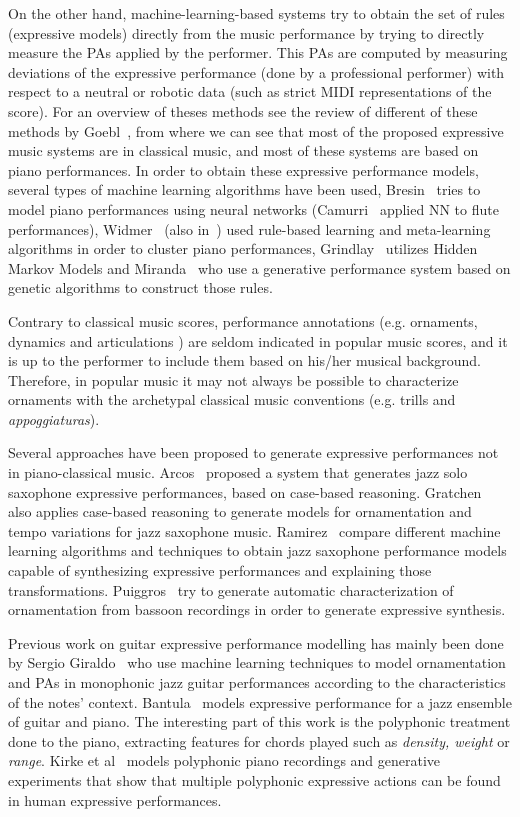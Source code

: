 On the other hand, machine-learning-based systems try to obtain the set of rules (expressive models) directly from the music performance by trying to directly measure the PAs applied by the performer. This PAs are computed by measuring deviations of the expressive performance (done by a professional performer) with respect to a neutral or robotic data (such as strict MIDI representations of the score). For an overview of theses methods see the review of different of these methods by Goebl~\cite{Goebl2005}, from where we can see that most of the proposed expressive music systems are in classical music, and most of these systems are based on piano performances. In order to obtain these expressive performance models, several types of machine learning algorithms have been used, Bresin~\cite{Bresin1998} tries to model piano performances using neural networks (Camurri~\cite{Camurri2000} applied NN to flute performances), Widmer~\cite{Widmer2003a} (also in~\cite{Widmer2003}) used rule-based learning and meta-learning algorithms in order to cluster piano performances, Grindlay~\cite{Grindlay2006} utilizes Hidden Markov Models and Miranda~\cite{Miranda2010} who use a generative performance system based on genetic algorithms to construct those rules. 

Contrary to classical music scores, performance annotations (e.g. ornaments, dynamics and articulations ) are seldom indicated in popular music scores, and it is up to the performer to include them based on his/her musical background. Therefore, in popular music it may not always be possible to characterize ornaments with the archetypal classical music conventions (e.g. trills and \textit{appoggiaturas}). 

Several approaches have been proposed to generate expressive performances not in piano-classical music. Arcos~\cite{Arcos1998} proposed a system that generates jazz solo saxophone expressive performances, based on case-based reasoning. Gratchen~\cite{Grachten2006} also applies case-based reasoning to generate models for ornamentation and tempo variations for jazz saxophone music. Ramirez~\cite{Ramirez2006} compare different machine learning algorithms and techniques to obtain jazz saxophone performance models capable of synthesizing expressive performances and explaining those transformations. Puiggros~\cite{Puiggros2006} try to generate automatic characterization of ornamentation from bassoon recordings in order to generate expressive synthesis.

Previous work on guitar expressive performance modelling has mainly been done by Sergio Giraldo~\cite{Giraldo2016} who use machine learning techniques to model ornamentation and PAs in monophonic jazz guitar performances according to the characteristics of the notes' context.
Bantula~\cite{bantula2016} models expressive performance for a jazz ensemble of guitar and piano. The interesting part of this work is the polyphonic treatment done to the piano, extracting features for chords played such as \textit{density, weight} or \textit{range}. Kirke et al~\cite{KirkeAlexisMiranda2013} models polyphonic piano recordings and generative experiments that show that multiple polyphonic expressive actions can be found in human expressive performances. 

